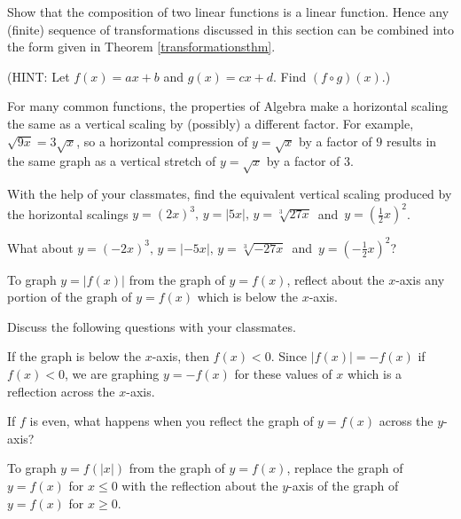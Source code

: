 \documentclass{ximera}
\begin{document}
\begin{question}
Show that the composition of two linear functions is  a linear function. Hence any (finite) sequence of transformations discussed in this section can be combined into the form given in Theorem \ref{transformationsthm}.

(HINT:  Let $f(x) = ax +b$ and $g(x) = cx + d$.  Find $(f \circ g)(x)$.)
\begin{solution}
\end{solution}

\end{question}

\begin{question}
For many common functions, the properties of Algebra make a horizontal scaling the same as a vertical scaling by (possibly) a different factor.  For example,  $\sqrt{9x} = 3\sqrt{x}$, so a horizontal compression of $y = \sqrt{x}$ by a factor of $9$ results in the same graph as a vertical stretch of $y = \sqrt{x}$ by a factor of $3$.  

With the help of your classmates, find the equivalent vertical scaling produced by the horizontal scalings $y = (2x)^{3}, \, y = |5x|, \, y = \sqrt[3]{27x} \, $ and $\, y = \left(\frac{1}{2} x\right)^{2}$.  

What about $y = (-2x)^{3}, \, y = |-5x|, \, y = \sqrt[3]{-27x}\, $ and $\, y = \left(-\frac{1}{2} x\right)^{2}$?

\newpage
\begin{solution}
To graph $y=|f(x)|$ from the graph of  $y=f(x)$, reflect about the $x$-axis any portion of the graph of $y=f(x)$ which is below the $x$-axis.
\end{solution}

\end{question}

\begin{question}
Discuss the following questions with your classmates.

\begin{solution}
If the graph is below the $x$-axis, then $f(x) < 0$.  Since $|f(x)| = -f(x)$ if $f(x) < 0$, we are graphing $y=-f(x)$ for these values of $x$ which is a reflection across the $x$-axis.
\end{solution}

\end{question}

\begin{question}
If $f$ is even, what happens when you reflect the graph of $y = f(x)$ across the $y$-axis?
\begin{solution}
To  graph  $y=f(|x|)$ from the graph of $y=f(x)$, replace the graph of $y=f(x)$ for $x \leq 0$ with the reflection about the $y$-axis of the graph of $y=f(x)$ for $x \geq 0$.
\end{solution}

\end{question}
\end{document}
